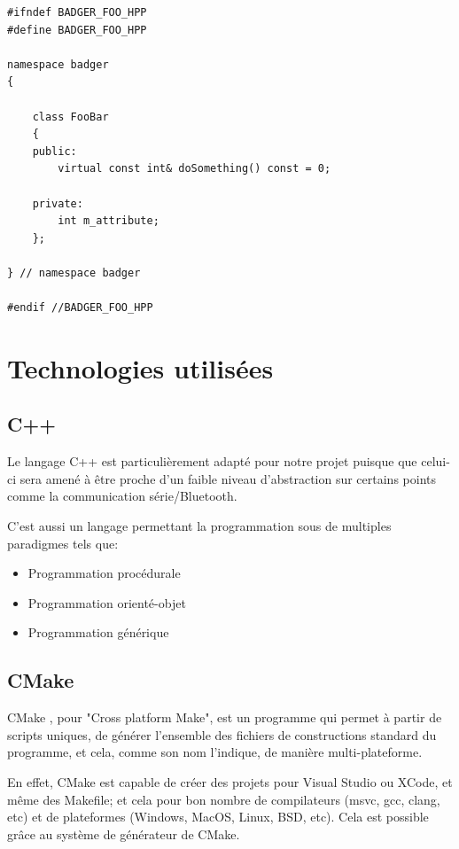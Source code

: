 \begin{lstlisting}
#ifndef BADGER_FOO_HPP
#define BADGER_FOO_HPP

namespace badger
{

    class FooBar
    {
    public:
        virtual const int& doSomething() const = 0;

    private:
        int m_attribute;
    };

} // namespace badger

#endif //BADGER_FOO_HPP
\end{lstlisting}

    \section{Technologies utilisées}

        \subsection{C++}
Le langage C++ est particulièrement adapté pour notre projet puisque que celui-ci
sera amené à être proche d'un faible niveau d'abstraction sur certains points
comme la communication série/Bluetooth.

C'est aussi un langage permettant la programmation sous de multiples paradigmes
tels que:

    \begin{itemize}
    \item Programmation procédurale
    \item Programmation orienté-objet
    \item Programmation générique
    \end{itemize}

        \subsection{CMake}
CMake \cite{cmake}, pour "Cross platform Make", est un programme qui permet à partir 
de scripts uniques, de générer l'ensemble des fichiers de constructions standard 
du programme, et cela, comme son nom l'indique, de manière multi-plateforme.

En effet, CMake est capable de créer des projets pour Visual Studio ou XCode, et même 
des Makefile; et cela pour bon nombre de compilateurs (msvc, gcc, clang, etc) et 
de plateformes (Windows, MacOS, Linux, BSD, etc). Cela est possible grâce au
système de générateur de CMake.

